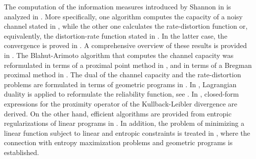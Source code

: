 \documentclass[smallextended,referee,envcountsect,]{svjour3}
\begin{document}
{The computation of the information measures introduced 
by Shannon in \cite{shannon-bell-1948,Shannon59} is analyzed in  
\cite{Arimoto72,Blahut72}. More specifically, 
one algorithm computes the capacity of a noisy 
channel stated in \cite[equation (7.1)]{cover-book-2006}, while the other one
calculates the rate-distortion function or, 
equivalently, the distortion-rate function stated in \cite[equations 
(10.11) and 
(10.160)]{cover-book-2006}. In the latter case, the convergence is 
proved in \cite{Csiszar74}. A comprehensive overview of these results 
is provided in \cite[Chap.~8]{CsiszarKorner(Book)11}. The 
Blahut-Arimoto algorithm that computes the channel capacity was 
reformulated in terms of a proximal point method in 
\cite{MatzDuhamel_ITW2004,NajaAlbergeDuhamel_ICASSP2010},
and in terms of a Bregman proximal method in 
\cite{FaustFawziSaunderson_PMLR23,Hayashi_TIT23,%
Hayashi_InfoGeometry2024,Hayashi_TIT25,%
Hayashi_InfoGeometry25,Hayashi_Quantum2024,%
HeSaundersonFawzi_TIT24,He2024efficient}.
The dual of the channel capacity and 
the rate-distortion problems are formulated in terms of geometric 
programs in \cite{ChiangBoyd_TIT2004}.
In \cite{BenTalTeboulleCharnes_JOTA88}, Lagrangian duality is 
applied to reformulate the reliability function, see 
\cite[pp.~152]{CsiszarKorner(Book)11}. 
In \cite{ElGhecheChierchiaPesquet_TIT2018}, closed-form 
expressions for the proximity operator of the Kullback-Leibler 
divergence are derived. On the other hand, efficient algorithms are 
provided from entropic regularizations of linear programs in 
\cite{Erlander81}. In addition, the problem of minimizing 
a linear function subject to linear and entropic constraints is treated in  
\cite{ChandrasekaranShah_MathProg2017}, where
the connection with entropy maximization problems and geometric 
programs is established.
}


%
%
%
\end{document}
